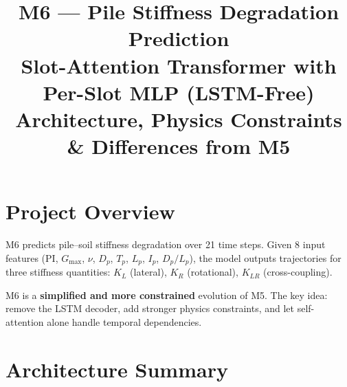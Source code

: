 \documentclass[11pt,a4paper]{article}
\title{\textbf{M6 --- Pile Stiffness Degradation Prediction}\\[0.3cm]
\large Slot-Attention Transformer with Per-Slot MLP (LSTM-Free)\\
Architecture, Physics Constraints \& Differences from M5}
\author{}
\date{}
\begin{document}
\maketitle

\section{Project Overview}

M6 predicts pile--soil stiffness degradation over 21 time steps. Given 8 input features (PI, $G_{\max}$, $\nu$, $D_p$, $T_p$, $L_p$, $I_p$, $D_p/L_p$), the model outputs trajectories for three stiffness quantities: $K_L$ (lateral), $K_R$ (rotational), $K_{LR}$ (cross-coupling).

M6 is a \textbf{simplified and more constrained} evolution of M5. The key idea: remove the LSTM decoder, add stronger physics constraints, and let self-attention alone handle temporal dependencies.

\section{Architecture Summary}
\end{document}
